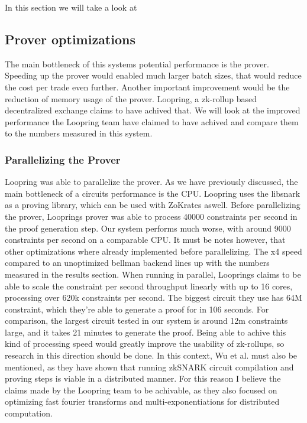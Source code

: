 \documentclass[../../thesis.tex]{subfiles}
\begin{document}
In this section we will take a look at 
\subsection{Prover optimizations}
The main bottleneck of this systems potential performance is the prover. Speeding up the prover would enabled much larger batch sizes, that would reduce the cost per trade even further. Another important improvement would be the reduction of memory usage of the prover. Loopring, a zk-rollup based decentralized exchange claims to have achived that. We will look at the improved performance the Loopring team have claimed to have achived \cite{loopring_2020} and compare them to the numbers measured in this system.

\subsubsection{Parallelizing the Prover}
Loopring was able to parallelize the prover. As we have previously discussed, the main bottleneck of a circuits performance is the CPU. Loopring uses the libsnark as a proving library, which can be used with ZoKrates aswell. Before parallelizing the prover, Looprings prover was able to process 40000 constraints per second in the proof generation step. Our system performs much worse, with around 9000 constraints per second on a comparable CPU. It must be notes however, that other optimizations where already implemented before parallelizing. The x4 speed compared to an unoptimized bellman backend lines up with the numbers measured in the results section. When running in parallel, Looprings claims to be able to scale the constraint per second throughput linearly with up to 16 cores, processing over 620k constraints per second. The biggest circuit they use has 64M constraint, which they're able to generate a proof for in 106 seconds. For comparison, the largest circuit tested in our system is around 12m constraints large, and it takes 21 minutes to generate the proof. Being able to achive this kind of processing speed would greatly improve the usability of zk-rollups, so research in this direction should be done. In this context, Wu et al. \cite{wu2018dizk} must also be mentioned, as they have shown that running zkSNARK circuit compilation and proving steps is viable in a distributed manner. For this reason I believe the claims made by the Loopring team to be achivable, as they also focused on optimizing fast fourier transforms and multi-exponentiations for distributed computation. 
\end{document}
